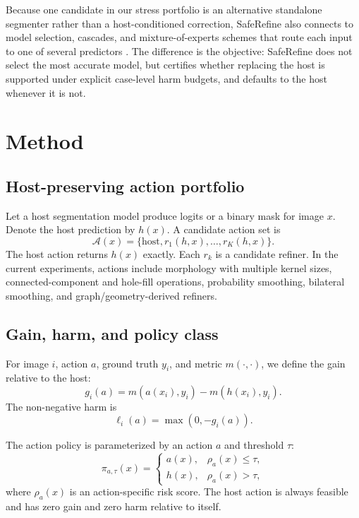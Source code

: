\documentclass[preprint,12pt]{elsarticle}
\begin{document}
Because one candidate in our stress portfolio is an alternative standalone
segmenter rather than a host-conditioned correction, SafeRefine also connects to
model selection, cascades, and mixture-of-experts schemes that route each input
to one of several predictors \cite{isensee2021nnunet,cheng2020cascadepsp}. The
difference is the objective: SafeRefine does not select the most accurate model,
but certifies whether replacing the host is supported under explicit case-level
harm budgets, and defaults to the host whenever it is not.

\section{Method}

\subsection{Host-preserving action portfolio}

Let a host segmentation model produce logits or a binary mask for image $x$.
Denote the host prediction by $h(x)$. A candidate action set is
\begin{equation}
    \mathcal{A}(x) = \{\mathrm{host}, r_1(h,x), \ldots, r_K(h,x)\}.
\end{equation}
The host action returns $h(x)$ exactly. Each $r_k$ is a candidate refiner. In
the current experiments, actions include morphology with multiple kernel sizes,
connected-component and hole-fill operations, probability smoothing, bilateral
smoothing, and graph/geometry-derived refiners.

\subsection{Gain, harm, and policy class}

For image $i$, action $a$, ground truth $y_i$, and metric $m(\cdot,\cdot)$, we
define the gain relative to the host:
\begin{equation}
    g_i(a) = m(a(x_i), y_i) - m(h(x_i), y_i).
\end{equation}
The non-negative harm is
\begin{equation}
    \ell_i(a) = \max(0, -g_i(a)).
\end{equation}

The action policy is parameterized by an action $a$ and threshold $\tau$:
\begin{equation}
    \pi_{a,\tau}(x) =
    \begin{cases}
        a(x), & \rho_a(x) \leq \tau,\\
        h(x), & \rho_a(x) > \tau,
    \end{cases}
\end{equation}
where $\rho_a(x)$ is an action-specific risk score. The host action is always
feasible and has zero gain and zero harm relative to itself.
\end{document}
